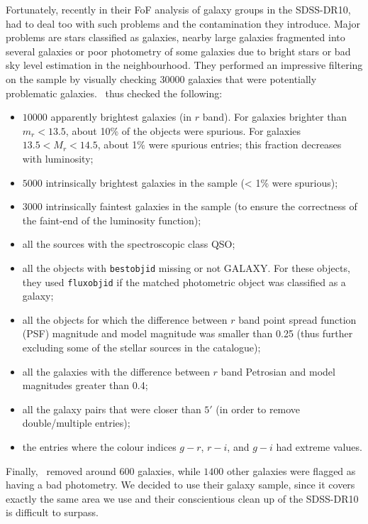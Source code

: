 Fortunately, recently in their FoF analysis of galaxy groups in the SDSS-DR10,
\cite{Tempel+14} had to deal too with such problems and the contamination they
introduce. Major problems are stars classified as galaxies, nearby large
galaxies fragmented into several galaxies or poor photometry of some galaxies
due to bright stars or bad sky level estimation in the neighbourhood. They
performed an impressive filtering on the sample by visually checking 30000
galaxies that were potentially problematic galaxies.~\cite{Tempel+14} thus
checked the following:
%
\begin{itemize}
    \item $10000$ apparently brightest galaxies (in $r$ band). For galaxies
        brighter than $m_r < 13.5$, about 10\% of the objects were spurious.
        For galaxies $13.5 < M_r < 14.5$, about 1\% were spurious entries; this
        fraction decreases with luminosity;
    \item $5000$ intrinsically brightest galaxies in the sample (< 1\% were
        spurious);
    \item $3000$ intrinsically faintest galaxies in the sample (to ensure the
        correctness of the faint-end of the luminosity function);
    \item all the sources with the spectroscopic class QSO\@;
    \item all the objects with \texttt{bestobjid} missing or not GALAXY\@. For
        these objects, they used \texttt{fluxobjid} if the matched photometric
        object was classified as a galaxy;
    \item all the objects for which the difference between $r$ band point
        spread function (PSF) magnitude and model magnitude was smaller than
        0.25 (thus further excluding some of the stellar sources in the
        catalogue);
    \item all the galaxies with the difference between $r$ band Petrosian and
        model magnitudes greater than 0.4;
    \item all the galaxy pairs that were closer than $5'$ (in order to remove
        double/multiple entries);
    \item the entries where the colour indices $g−r$, $r−i$, and $g−i$ had
        extreme values.
\end{itemize}

Finally,~\cite{Tempel+14} removed around $600$ galaxies, while $1400$ other
galaxies were flagged as having a bad photometry. We decided to use their
galaxy sample, since it covers exactly the same area we use and their
conscientious clean up of the SDSS-DR10 is difficult to surpass.

